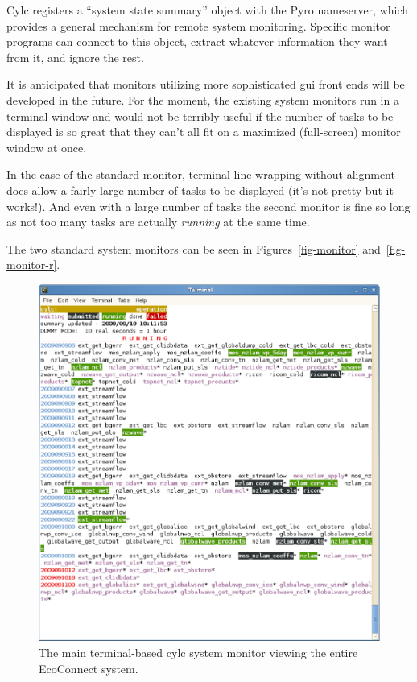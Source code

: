 \documentclass[11pt,a4paper]{article}
\begin{document}
Cylc registers a ``system state summary'' object with the Pyro
nameserver, which provides a general mechanism for remote system
monitoring. Specific monitor programs can connect to this object, 
extract whatever information they want from it, and ignore the rest. 

It is anticipated that monitors utilizing more sophisticated gui front
ends will be developed in the future. For the moment, the existing
system monitors run in a terminal window and would not be terribly
useful if the number of tasks to be displayed is so great that they
can't all fit on a maximized (full-screen) monitor window at once.

In the case of the standard monitor, terminal line-wrapping without
alignment does allow a fairly large number of tasks to be displayed
(it's not pretty but it works!). And even with a large number of tasks
the second monitor is fine so long as not too many tasks are actually
{\em running} at the same time. 

The two standard system monitors can be seen in
Figures~\ref{fig-monitor} and~\ref{fig-monitor-r}.

\begin{figure} \label{fig-monitor-eco} 
    \begin{center}
        \includegraphics[width=14cm]{eco-monitor} 
    \end{center}
    \caption[monitor view of EcoConnect]{\small The main terminal-based
    cylc system monitor viewing the entire EcoConnect system.}
\end{figure} 
\end{document}
